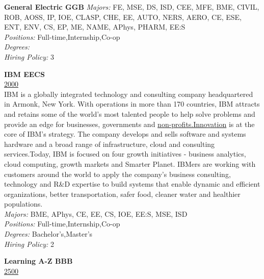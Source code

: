 \documentclass[twoside]{article}
\begin{document}
\begin{center}
\begin{multicols}{2}
\begin{minipage}{.95\columnwidth}{\Large\bf General Electric \hfill GGB}
    \emph{Majors:} FE, MSE, DS, ISD, CEE, MFE, BME, CIVIL, ROB, AOSS, IP, IOE, CLASP, CHE, EE, AUTO, NERS, AERO, CE, ESE, ENT, ENV, CS, EP, ME, NAME, APhys, PHARM, EE:S\\
    \emph{Positions:} Full-time,Internship,Co-op\\
    \emph{Degrees:} \\
    \emph{Hiring Policy:} 3\\
\end{minipage}
 \begin{minipage}{.95\columnwidth}{\Large\bf IBM \hfill EECS}\\
    \url{2000}\\
    IBM is a globally integrated technology and consulting company headquartered in Armonk, New York. With operations in more than 170 countries, IBM attracts and retains some of the world's most talented people to help solve problems and provide an edge for businesses, governments and \url{non-profits.Innovation} is at the core of IBM's strategy. The company develops and sells software and systems hardware and a broad range of infrastructure, cloud and consulting services.Today, IBM is focused on four growth initiatives - business analytics, cloud computing, growth markets and Smarter Planet. IBMers are working with customers around the world to apply the company's business consulting, technology and R\&D expertise to build systems that enable dynamic and efficient organizations, better transportation, safer food, cleaner water and healthier populations.\\
    \emph{Majors:} BME, APhys, CE, EE, CS, IOE, EE:S, MSE, ISD\\
    \emph{Positions:} Full-time,Internship,Co-op\\
    \emph{Degrees:} Bachelor's,Master's\\
    \emph{Hiring Policy:} 2\\
\end{minipage}
 \begin{minipage}{.95\columnwidth}{\Large\bf Learning A-Z \hfill BBB}\\
    \url{2500}\\

\end{minipage}
\end{multicols}
\end{center}
\end{document}
